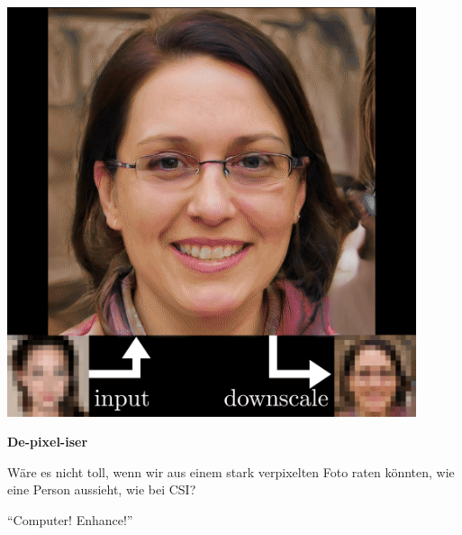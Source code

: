 \documentclass[aspectratio=169,usenames,dvipsnames]{beamer}
\begin{document}
\begin{frame}
\begin{minipage}{.5\textwidth}
\includegraphics[width=0.9\textwidth, keepaspectratio]{images/step0}
\end{minipage}\begin{minipage}{.5\textwidth}
\textbf{De-pixel-iser}
\bigskip

Wäre es nicht toll, wenn wir aus einem stark verpixelten Foto raten könnten, wie eine Person aussieht, wie bei CSI?
\bigskip

``Computer! Enhance!''
\end{minipage}
\end{frame}
\end{document}
